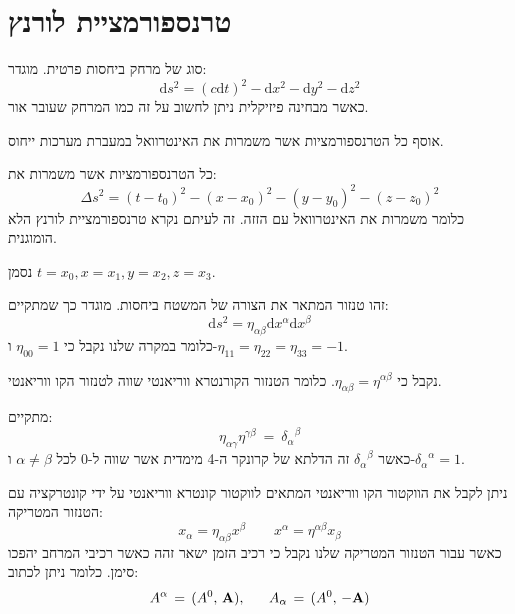 \documentclass{tstextbook}
\begin{document}
\section{טרנספורמציית לורנץ}

\begin{definition}[אינטרוואל]
סוג של מרחק ביחסות פרטית. מוגדר:
$$ \mathrm{d}s^{2} = \left( c\mathrm{d}t \right)^2-\mathrm{d}x^2-\mathrm{d}y^2-\mathrm{d}z^2$$
כאשר מבחינה פיזיקלית ניתן לחשוב על זה כמו המרחק שעובר אור.

\end{definition}
\begin{definition}
אוסף כל הטרנספורמציות אשר משמרות את האינטרוואל במעברת מערכות ייחוס.

\end{definition}
\begin{definition}
כל הטרנספורמציות אשר משמרות את:
$$\Delta s^{2}=(t-t_{0})^{2}-(x-x_{0})^{2}-(y-y_{0})^{2}-(z-z_{0})^{2}$$
כלומר משמרות את האינטרוואל עם הזזה. זה לעיתם נקרא טרנספורמציית לורנץ הלא הומוגנית.

\end{definition}
\begin{symbolize}
נסמן \(t=x_{0},x=x_{1},y=x_{2},z=x_{3}\).

\end{symbolize}
\begin{definition}
זהו טנזור המתאר את הצורה של המשטח ביחסות. מוגדר כך שמתקיים:
$$\mathrm{d}s ^{2}=\eta_{\alpha \beta}\mathrm{d}x^{\alpha}\mathrm{d}x^{\beta}$$
כלומר במקרה שלנו נקבל כי \(\eta_{00}=1\) ו-\(\eta_{11}=\eta_{22}=\eta_{33}=-1\).

\end{definition}
\begin{remark}
נקבל כי \(\eta_{\alpha \beta}=\eta^{\alpha \beta}\). כלומר הטנזור הקורנטרא ווריאנטי שווה לטנזור הקו ווריאנטי.

\end{remark}
\begin{proposition}
מתקיים:$$
\eta_{\alpha\gamma}\eta^{\gamma\beta}\:=\:{\delta_{\alpha}}^{\beta}$$
כאשר \({\delta_{\alpha}}^{\beta}\) זה הדלתא של קרונקר ה-4 מימדית אשר שווה ל-0 לכל \(\alpha \neq \beta\) ו-\({\delta_{\alpha}}^{\alpha}=1\).

\end{proposition}
\begin{proposition}
ניתן לקבל את הווקטור הקו ווריאנטי המתאים לווקטור קונטרא ווריאנטי על ידי קונטרקציה עם הטנזור המטריקה:
$$x_{\alpha}=\eta_{\alpha \beta}x^{\beta}\qquad x^{\alpha}=\eta^{\alpha \beta}x_{\beta}$$
כאשר עבור הטנזור המטריקה שלנו נקבל כי רכיב הזמן ישאר זהה כאשר רכיבי המרחב יהפכו סימן. כלומר ניתן לכתוב:
$$A^{\alpha}\,=\,(A^{0},\,{\bf A}),\;\;\;\;\;\;A_{\alpha}\,=\,(A^{0},\,-{\bf A})$$

\end{proposition}
\end{document}
